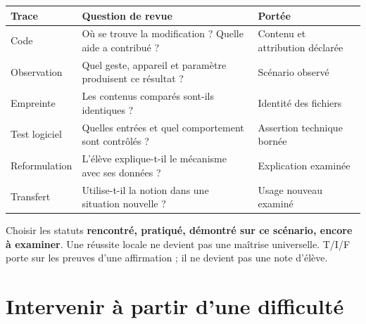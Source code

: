 \documentclass[
  canadien,
  11pt,
  a4paper,
]{report}
\newcounter{none} %
\begin{document}
{\def\LTcaptype{none} %
\begin{longtable}[]{@{}
  >{\raggedright\arraybackslash}p{}
  >{\raggedright\arraybackslash}p{}
  >{\raggedright\arraybackslash}p{}@{}}
\toprule\noalign{}
\begin{minipage}[b]{\linewidth}\raggedright
Trace
\end{minipage} & \begin{minipage}[b]{\linewidth}\raggedright
Question de revue
\end{minipage} & \begin{minipage}[b]{\linewidth}\raggedright
Portée
\end{minipage} \\
\midrule\noalign{}
\endhead
\bottomrule\noalign{}
\endlastfoot
Code & Où se trouve la modification ? Quelle aide a contribué ? &
Contenu et attribution déclarée \\
Observation & Quel geste, appareil et paramètre produisent ce résultat ?
& Scénario observé \\
Empreinte & Les contenus comparés sont-ils identiques ? & Identité des
fichiers \\
Test logiciel & Quelles entrées et quel comportement sont contrôlés ? &
Assertion technique bornée \\
Reformulation & L'élève explique-t-il le mécanisme avec ses données ? &
Explication examinée \\
Transfert & Utilise-t-il la notion dans une situation nouvelle ? & Usage
nouveau examiné \\
\end{longtable}
}

Choisir les statuts \textbf{rencontré, pratiqué, démontré sur ce
scénario, encore à examiner}. Une réussite locale ne devient pas une
maîtrise universelle. T/I/F porte sur les preuves d'une affirmation ; il
ne devient pas une note d'élève.

\section{Intervenir à partir d'une
difficulté}\label{intervenir-uxe0-partir-dune-difficultuxe9}
\end{document}
